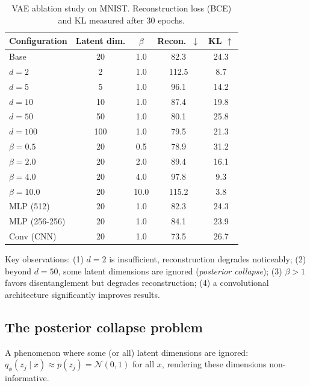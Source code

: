 \begin{table}[htbp]
\centering
\caption{VAE ablation study on MNIST. Reconstruction loss (BCE) and KL measured after 30 epochs.}
\label{tab:vae-ablation}
\begin{tabular}{lcccc}
\toprule
\textbf{Configuration} & \textbf{Latent dim.} & \textbf{$\beta$} & \textbf{Recon.\ $\downarrow$} & \textbf{KL $\uparrow$} \\
\midrule
Base & 20 & 1.0 & 82.3 & 24.3 \\
\midrule
$d=2$ & 2 & 1.0 & 112.5 & 8.7 \\
$d=5$ & 5 & 1.0 & 96.1 & 14.2 \\
$d=10$ & 10 & 1.0 & 87.4 & 19.8 \\
$d=50$ & 50 & 1.0 & 80.1 & 25.8 \\
$d=100$ & 100 & 1.0 & 79.5 & 21.3 \\
\midrule
$\beta = 0.5$ & 20 & 0.5 & 78.9 & 31.2 \\
$\beta = 2.0$ & 20 & 2.0 & 89.4 & 16.1 \\
$\beta = 4.0$ & 20 & 4.0 & 97.8 & 9.3 \\
$\beta = 10.0$ & 20 & 10.0 & 115.2 & 3.8 \\
\midrule
MLP (512) & 20 & 1.0 & 82.3 & 24.3 \\
MLP (256-256) & 20 & 1.0 & 84.1 & 23.9 \\
Conv (CNN) & 20 & 1.0 & 73.5 & 26.7 \\
\bottomrule
\end{tabular}
\end{table}

\begin{remark}
Key observations: (1) $d=2$ is insufficient, reconstruction degrades noticeably; (2) beyond $d=50$, some latent dimensions are ignored (\emph{posterior collapse}); (3) $\beta > 1$ favors disentanglement but degrades reconstruction; (4) a convolutional architecture significantly improves results.
\end{remark}

\subsection{The posterior collapse problem}

\begin{definition}
A phenomenon where some (or all) latent dimensions are ignored: $q_\phi(z_j \mid x) \approx p(z_j) = \mathcal{N}(0, 1)$ for all $x$, rendering these dimensions non-informative.
\end{definition}

